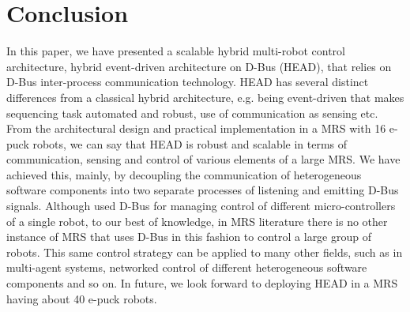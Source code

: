 \documentclass[draft]{ifacconf}
\begin{document}
\section{Conclusion}
\label{sec:conc}
In this paper, we have presented a scalable hybrid multi-robot control architecture, hybrid event-driven architecture on D-Bus (HEAD), that relies on D-Bus inter-process communication technology. HEAD has several distinct differences from a classical hybrid architecture, e.g. being event-driven that makes sequencing task automated and robust, use of communication as sensing etc. From the architectural design and practical implementation in a MRS with 16 e-puck robots, we can say that HEAD is robust and scalable in terms of communication, sensing and control of various elements of a large MRS. We have achieved this, mainly, by decoupling the communication of heterogeneous software components into two separate processes of listening and emitting D-Bus signals.
Although \cite{Magnenat+2009} used D-Bus for managing control of different micro-controllers of a single robot, to our best of knowledge, in MRS literature there is no other instance of MRS that uses D-Bus in this fashion to control a large group of robots. This same control strategy can be applied to many other fields, such as in multi-agent systems, networked control of different heterogeneous software components and so on.
In future, we look forward to deploying HEAD in a MRS having about 40 e-puck robots.


                                                   

\end{document}

